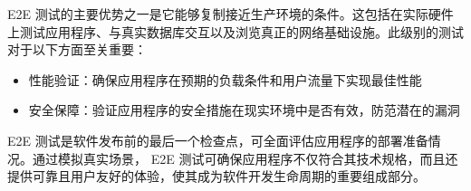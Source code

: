 
E2E 测试的主要优势之一是它能够复制接近生产环境的条件。这包括在实际硬件上测试应用程序、与真实数据库交互以及浏览真正的网络基础设施。此级别的测试对于以下方面至关重要：

\begin{itemize}
\item
性能验证：确保应用程序在预期的负载条件和用户流量下实现最佳性能

\item
安全保障：验证应用程序的安全措施在现实环境中是否有效，防范潜在的漏洞
\end{itemize}

E2E 测试是软件发布前的最后一个检查点，可全面评估应用程序的部署准备情况。通过模拟真实场景， E2E 测试可确保应用程序不仅符合其技术规格，而且还提供可靠且用户友好的体验，使其成为软件开发生命周期的重要组成部分。




